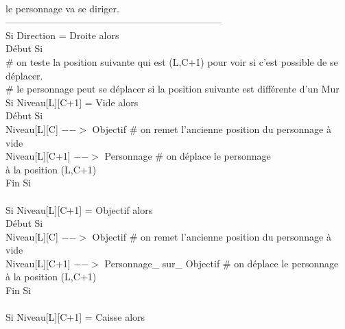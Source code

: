 \documentclass{article}
\begin{document}
\begin{tabbing}
\\ \hspace{2cm} le personnage va se diriger.
\\		--------------------------------------------------------------------
\\	\hspace{2cm} Si Direction = Droite alors
\\	\hspace{2cm} Début Si
\\	\hspace{3cm}	\# on teste la position suivante qui est (L,C+1)	pour voir si c'est possible de se déplacer.
\\	\hspace{3cm}	\# le personnage peut se déplacer si la position suivante est différente d'un Mur			
\\	\hspace{3cm}	Si Niveau[L][C+1] = Vide alors			
\\	\hspace{3cm}	Début Si
\\	\hspace{4cm}		Niveau[L][C] $-->$ Objectif 		\# on remet l'ancienne position du personnage à vide
\\	\hspace{4cm}	Niveau[L][C+1] $-->$ Personnage		\# on déplace le personnage
\\ \hspace{4cm} à la position (L,C+1)
\\	\hspace{3cm}	Fin Si 
\\		
\\	\hspace{3cm}	Si Niveau[L][C+1] = Objectif alors			
\\	\hspace{3cm}	Début Si
\\	\hspace{4cm}		Niveau[L][C] $-->$ Objectif 			\# on remet l'ancienne position du personnage à vide
\\	\hspace{4cm}		Niveau[L][C+1] $-->$ Personnage\_ sur\_ Objectif	\# on déplace le personnage
\\ \hspace{4cm} à la position (L,C+1)
\\	\hspace{3cm}	Fin Si 
\\		
\\	\hspace{3cm}	Si Niveau[L][C+1] = Caisse alors			

\end{tabbing}
\end{document}
